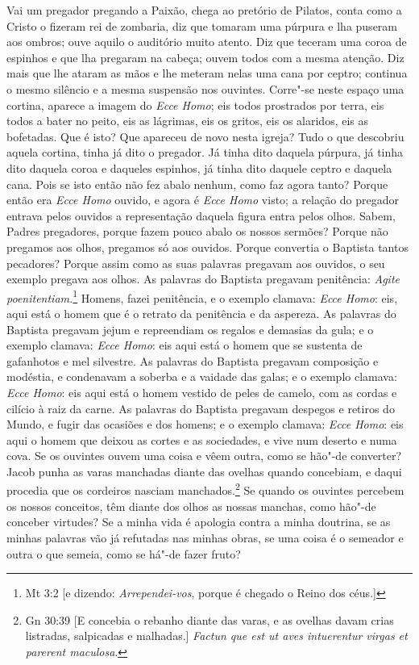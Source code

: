 Vai um pregador pregando a Paixão, chega ao pretório de Pilatos, conta como a Cristo o fizeram rei de zombaria, diz que tomaram
uma púrpura e lha puseram aos ombros; ouve aquilo o auditório muito
atento. Diz que teceram uma coroa de espinhos e que lha pregaram na
cabeça; ouvem todos com a mesma atenção. Diz mais que lhe ataram as
mãos e lhe meteram nelas uma cana por ceptro; continua o mesmo silêncio
e a mesma suspensão nos ouvintes. Corre"-se neste espaço uma cortina,
aparece a imagem do \emph{Ecce Homo}; eis todos prostrados por terra, eis todos a
bater no peito, eis as lágrimas, eis os gritos, eis os alaridos, eis as
bofetadas. Que é isto? Que apareceu de novo nesta igreja? Tudo o que
descobriu aquela cortina, tinha já dito o pregador. Já tinha dito
daquela púrpura, já tinha dito daquela coroa e daqueles espinhos, já
tinha dito daquele ceptro e daquela cana. Pois se isto então não fez
abalo nenhum, como faz agora tanto? Porque então era \emph{Ecce
Homo} ouvido, e agora é \emph{Ecce Homo} visto; a relação do pregador
entrava pelos ouvidos a representação daquela figura entra pelos olhos.
Sabem, Padres pregadores, porque fazem pouco abalo os nossos sermões? Porque não pregamos aos olhos, pregamos só aos ouvidos. Porque
convertia o Baptista tantos pecadores? Porque assim como as suas
palavras pregavam aos ouvidos, o seu exemplo pregava aos olhos. As
palavras do Baptista pregavam penitência: \emph{Agite poenitentiam.}\footnote{Mt 3:2 [e dizendo: \textit{Arrependei-vos}, porque é chegado o Reino dos céus.]}
Homens, fazei penitência, e o exemplo clamava: \emph{Ecce Homo}: eis, aqui está o homem que
é o retrato da penitência e da aspereza. As palavras do Baptista
pregavam jejum e repreendiam os regalos e demasias da gula; e o exemplo
clamava: \emph{Ecce Homo}: eis aqui está o homem que se sustenta de
gafanhotos e mel silvestre. As palavras do Baptista pregavam composição
e modéstia, e condenavam a soberba e a vaidade das galas; e o exemplo
clamava: \emph{Ecce Homo}: eis aqui está o homem vestido de peles de
camelo, com as cordas e cilício à raiz da carne. As palavras do Baptista
pregavam despegos e retiros do Mundo, e fugir das ocasiões e dos
homens; e o exemplo clamava: \emph{Ecce Homo}: eis aqui o homem que
deixou as cortes e as sociedades, e vive num deserto e numa cova. Se os
ouvintes ouvem uma coisa e vêem outra, como se hão"-de converter? Jacob
punha as varas manchadas diante das ovelhas quando concebiam, e daqui
procedia que os cordeiros nasciam manchados.\footnote{Gn 30:39 [E concebia o rebanho diante das varas, e as ovelhas davam crias listradas, salpicadas e malhadas.] \emph{Factun que est ut aves intuerentur virgas et parerent maculosa}.} Se quando os ouvintes
percebem os nossos conceitos, têm diante dos olhos as nossas manchas,
como hão"-de conceber virtudes? Se a minha vida é apologia contra a minha
doutrina, se as minhas palavras vão já refutadas nas minhas obras, se
uma coisa é o semeador e outra o que semeia, como se há"-de fazer fruto?

